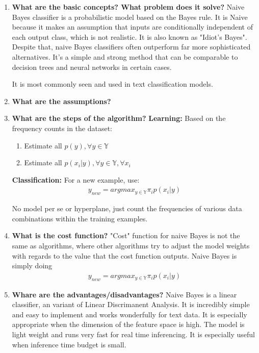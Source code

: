 \documentclass{article}
\begin{document}
\noindent
\begin{enumerate}
    \item \textbf{What are the basic concepts? What problem does it solve?}
    \noindent 
    \smallbreak
    Naive Bayes classifier is a probabilistic model based on the Bayes rule. It is Naive because it makes an assumption that inputs are conditionally independent of each output class, which is not realistic. It is also known as "Idiot's Bayes"\cite{1}. Despite that, naive Bayes classifiers often outperform far more sophisticated alternatives. It's a simple and strong method that can be comparable to decision trees and neural networks in certain cases.
    
    It is most commonly seen and used in text classification models. 
    
    \item \textbf{What are the assumptions?}
    \noindent 
    \smallbreak
    
    
    \item \textbf{What are the steps of the algorithm?}
    \noindent 
    \smallbreak
    \textbf{Learning:} Based on the frequency counts in the dataset:
    \begin{enumerate}
        \item Estimate all $p(y), \forall y \in \mathbb{Y}$
        \item Estimate all $p(x_i|y), \forall y \in \mathbb{Y}, \forall x_i$
    \end{enumerate}
    \textbf{Classification:} For a new example, use:\\
    \begin{align*}
        y_{new} = argmax_{y \in \mathbb{Y}} \pi_{i} p(x_i|y)    
    \end{align*}
    
    No model per se or hyperplane, just count the frequencies of various data combinations within the training examples.
    
    \item \textbf{What is the cost function?}
    \noindent 
    \smallbreak
    "Cost" function for naive Bayes is not the same as algorithms, where other algorithms try to adjust the model weights with regards to the value that the cost function outputs. Naive Bayes is simply doing 
    \begin{align*}
        y_{new} = argmax_{y \in \mathbb{Y}} \pi_{i} p(x_i|y)    
    \end{align*}
    
    \item \textbf{Whare are the advantages/disadvantages?}
    \noindent 
    \smallbreak
    Naive Bayes is a linear classifier, an variant of Linear Discrimanent Analysis. It is incredibly simple and easy to implement and works wonderfully for text data. It is especially appropriate when the dimension of the feature space is high. The model is light weight and runs very fast for real time inferencing. It is especially useful when inference time budget is small.
    

\end{enumerate}
\end{document}

